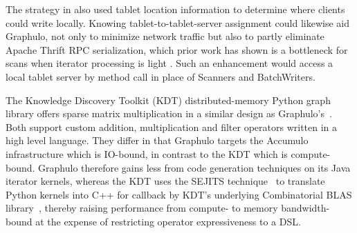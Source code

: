 The strategy in \cite{kepner2014achieving} 
also used %
tablet location information
to determine where clients could write locally.
Knowing tablet-to-tablet-server assignment could likewise aid Graphulo, 
not only to minimize network traffic
but also
 to partly eliminate Apache Thrift RPC serialization,
which prior work has shown is a bottleneck for scans %
when iterator processing is light \cite{sawyer2013understanding}.
Such an enhancement would access a local tablet server by method call 
in place of Scanners and BatchWriters.


The Knowledge Discovery Toolkit (KDT) distributed-memory Python graph library
offers sparse matrix multiplication in a similar design as Graphulo's~\cite{bulucc2013high}.
Both support custom addition, multiplication and filter operators written 
in a high level language.
They differ in that Graphulo targets the Accumulo infrastructure
which is IO-bound, %
in contrast to the KDT which is compute-bound. %
Graphulo therefore gains less from code generation techniques on its Java iterator kernels, 
whereas the KDT uses the SEJITS technique~\cite{catanzaro2009sejits} to translate %
Python kernels into C++ 
for callback by KDT's underlying Combinatorial BLAS library~\cite{bulucc2011combinatorial},
thereby raising performance from compute- to memory bandwidth-bound 
at the expense of restricting operator expressiveness to a DSL.

